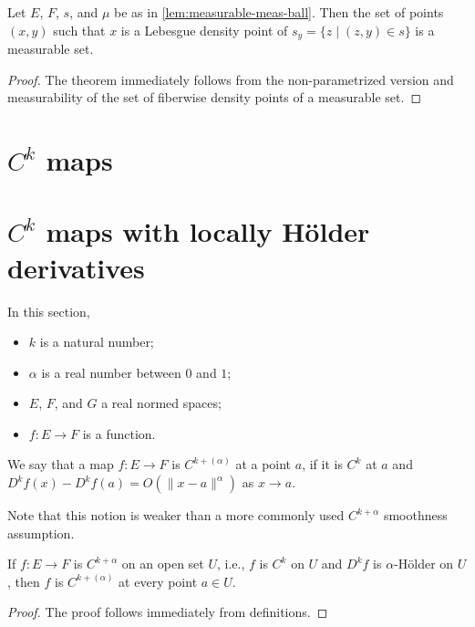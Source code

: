 \begin{corollary}%
  \label{cor:measurable-density}
  \leanok%
  Let \(E\), \(F\), \(s\), and \(\mu\) be as in \autoref{lem:measurable-meas-ball}.
  Then the set of points \((x, y)\) such that \(x\) is a Lebesgue density point of \(s_{y} = \{z \mid (z, y) \in s\}\)
  is a measurable set.
\end{corollary}
\begin{proof}
  \leanok%
  The theorem immediately follows from the non-parametrized version
  and measurability of the set of fiberwise density points of a measurable set.
\end{proof}

\section{\(C^k\) maps}%
\label{sec:ck-maps}

\section{\(C^{k}\) maps with locally Hölder derivatives}

In this section,
\begin{itemize}
\item \(k\) is a natural number;
\item \(\alpha\) is a real number between \(0\) and \(1\);
\item \(E\), \(F\), and \(G\) a real normed spaces;
\item \(f\colon E \to F\) is a function.
\end{itemize}

\begin{definition}%
  \label{def:cdh-at}
  \leanok%
  We say that a map \(f\colon E\to F\) is \emph{\(C^{k+(\alpha)}\)} at a point \(a\),
  if it is \(C^{k}\) at \(a\) and \(D^{k}f(x) - D^{k}f(a) = O(\|x - a\|^{\alpha})\) as \(x\to a\).
\end{definition}

Note that this notion is weaker than a more commonly used \(C^{k+\alpha}\) smoothness assumption.
\begin{lemma}%
  \label{def:contdiffholder-imp-cdh-at}
  If \(f\colon E \to F\) is \(C^{k+\alpha}\) on an open set \(U\),
  i.e., \(f\) is \(C^{k}\) on \(U\) and \(D^{k}f\) is \(\alpha\)-Hölder on \(U\),
  then \(f\) is \(C^{k+(\alpha)}\) at every point \(a \in U\).
\end{lemma}
\begin{proof}
  The proof follows immediately from definitions.
\end{proof}

